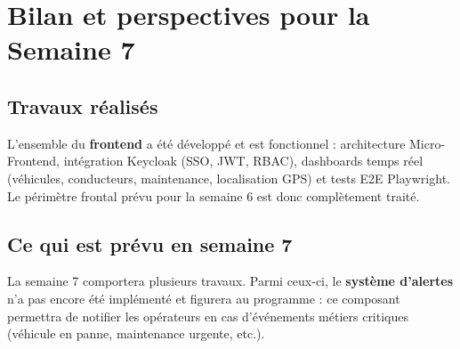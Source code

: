 \documentclass[12pt,a4paper]{article}
\begin{document}
\newpage
\section{Bilan et perspectives pour la Semaine 7}

\subsection{Travaux r\'{e}alis\'{e}s}

L'ensemble du \textbf{frontend} a \'{e}t\'{e} d\'{e}velopp\'{e} et est fonctionnel : architecture Micro-Frontend, int\'{e}gration Keycloak (SSO, JWT, RBAC), dashboards temps r\'{e}el (v\'{e}hicules, conducteurs, maintenance, localisation GPS) et tests E2E Playwright. Le p\'{e}rim\`{e}tre frontal pr\'{e}vu pour la semaine 6 est donc compl\`{e}tement trait\'{e}.

\subsection{Ce qui est pr\'{e}vu en semaine 7}

La semaine 7 comportera plusieurs travaux. Parmi ceux-ci, le \textbf{syst\`{e}me d'alertes} n'a pas encore \'{e}t\'{e} impl\'{e}ment\'{e} et figurera au programme : ce composant permettra de notifier les op\'{e}rateurs en cas d'\'{e}v\'{e}nements m\'{e}tiers critiques (v\'{e}hicule en panne, maintenance urgente, etc.).
\end{document}
